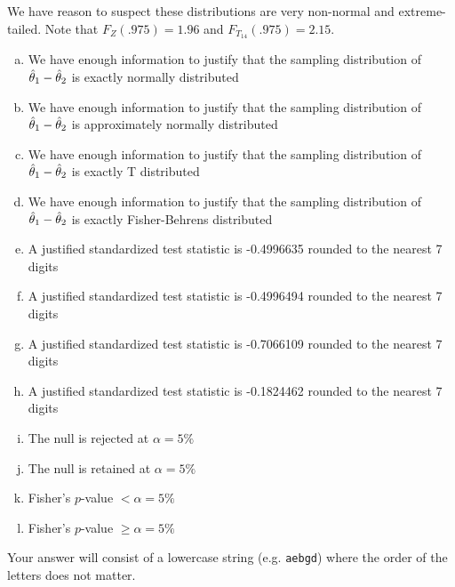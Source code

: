 \documentclass[12pt,landscape]{article}
\newcommand{\instr}{\small Your answer will consist of a lowercase string (e.g. \texttt{aebgd}) where the order of the letters does not matter. \normalsize}
\begin{document}
\vspace{-0.2cm}\benum{}   We have reason to suspect these distributions are very non-normal and extreme-tailed. Note that $F_Z(.975) = 1.96$ and $F_{T_{14}}(.975) = 2.15$.

\begin{enumerate}[(a)]
\item We have enough information to justify that the sampling distribution of $\hat{\theta}_1 - \hat{\theta}_2$ is exactly normally distributed
\item We have enough information to justify that the sampling distribution of $\hat{\theta}_1 - \hat{\theta}_2$ is approximately normally distributed
\item We have enough information to justify that the sampling distribution of $\hat{\theta}_1 - \hat{\theta}_2$ is exactly T distributed
\item We have enough information to justify that the sampling distribution of $\hat{\theta}_1 - \hat{\theta}_2$ is exactly Fisher-Behrens distributed

\item A justified standardized test statistic is -0.4996635 rounded to the nearest 7 digits %
\item A justified standardized test statistic is -0.4996494 rounded to the nearest 7 digits 
\item A justified standardized test statistic is -0.7066109 rounded to the nearest 7 digits
\item A justified standardized test statistic is -0.1824462 rounded to the nearest 7 digits

\item The null is rejected at $\alpha = 5\%$
\item The null is retained at $\alpha = 5\%$

\item Fisher's $p$-value $ < \alpha = 5\%$
\item Fisher's $p$-value $ \geq \alpha = 5\%$
\end{enumerate}
\eenum\instr\pagebreak
\end{document}
